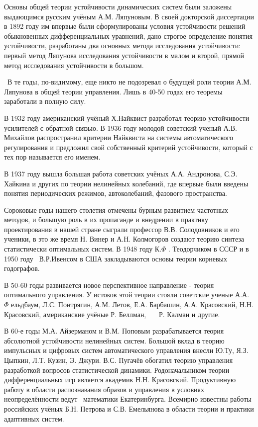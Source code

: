 		Основы общей теории устойчивости динамических систем были за­ложены выдающимся русским учёным А.М. Ляпуновым. В своей
		докторской диссертации в 1892 году им впервые были сформулированы условия ус­тойчивости решений обыкновенных
		дифференциальных уравнений, дано строгое определение понятия устойчивости, разработаны два основных метода исследования
		устойчивости: первый метод Ляпунова исследования устойчивости в малом и второй, прямой метод исследования устойчивости
		в большом.



		\ В те годы, по-видимому, еще никто не подоз­ревал о будущей роли теории А.М. Ляпунова в общей теории управления. Лишь в
		40-50 годах его теоремы заработали в полную силу.



		В 1932 году американский учёный Х.Найквист разработал теорию устойчивости усилителей с обратной связью. В 1936 году
		молодой со­ветский ученый А.В. Михайлов распространил критерии Найквиста на системы автоматического регулирования и
		предложил свой собственный критерий устойчивости, который с тех пор называется его именем.



		В 1937 году вышла большая работа советских учёных А.А. Андро­нова, С.Э. Хайкина и других по теории нелинейных колебаний,
		где впервые были введены понятия периодических режимов, автоколебаний, фазового пространства.



		Сороковые годы нашего столетия отмечены бурным развитием час­тотных методов, и большую роль в их пропаганде и внедрении
		в прак­тику проектирования в нашей стране сыграли профессор В.В. Солодовни­ков и его ученики, в это же время Н. Винер и
		А.Н. Колмогоров создают теорию синтеза статистически оптимальных систем. В 1948 году К.$ \Phi $ . Теодорчиком в СССР и в 1950
		году \ В.Р.Ивенсом в США закладываются осно­вы теории корневых годографов.



		В 50-60 годы развивается новое перспективное направление - теория оптимального управления. У истоков этой теории стояли
		совет­ские ученые А.А. $ \Phi $ ельдбаум, Л.С. Понтрягин, А.М. Летов, Е.А. Барбашин, А.А. Красовский, Н.Н. Красовский,
		американские учёные Р. Беллман, \ \ \ Р. Калман и другие.



		В 60-е годы М.А. Айзерманом и В.М. Поповым разрабатывается теория абсолютной устойчивости нелинейных систем. Большой
		вклад в теорию импульсных и цифровых систем автоматического управления внесли Ю.Ту, Я.З. Цыпкин, Л.Т. Кузин, Э. Джури.
		В.С. Пугачёв обогатил теорию управ­ления разработкой вопросов статистической динамики. Родоначальником теории
		дифференциальных игр является академик Н.Н. Красовский. Продуктивную работу в области распознавания образов и
		управления в условиях неопределённости ведут \ математики Екатеринбурга. Всемирно известны работы российских учёных
		Б.Н. Петрова и С.В. Емельянова в области те­ории и практики адаптивных систем.




